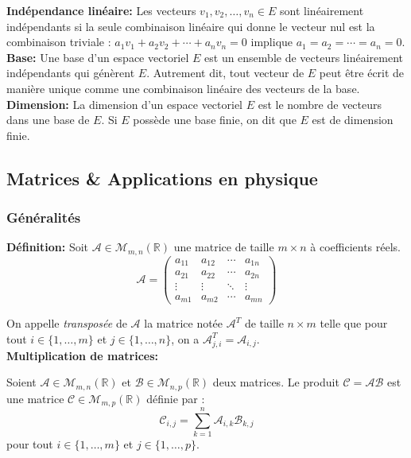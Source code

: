 \textbf{Indépendance linéaire:}
Les vecteurs $v_1, v_2, \ldots, v_n \in E$ sont linéairement indépendants si la seule combinaison linéaire qui donne le vecteur nul est la combinaison triviale : $a_1 v_1 + a_2 v_2 + \cdots + a_n v_n = 0$ implique $a_1 = a_2 = \cdots = a_n = 0$. \\

\textbf{Base:}
Une base d'un espace vectoriel $E$ est un ensemble de vecteurs linéairement indépendants qui génèrent $E$. Autrement dit, tout vecteur de $E$ peut être écrit de manière unique comme une combinaison linéaire des vecteurs de la base. \\

\textbf{Dimension:}
La dimension d'un espace vectoriel $E$ est le nombre de vecteurs dans une base de $E$. Si $E$ possède une base finie, on dit que $E$ est de dimension finie. \\

\subsection{Matrices \& Applications en physique}

\subsubsection{Généralités}
\textbf{Définition:}
Soit $\mathcal{A}  \in \mathcal{M}_{m,n}(\mathbb{R})$ une matrice de taille $m \times n$ à coefficients réels. 
\[
\mathcal{A}  = \begin{pmatrix}
a_{11} & a_{12} & \cdots & a_{1n} \\
a_{21} & a_{22} & \cdots & a_{2n} \\
\vdots & \vdots & \ddots & \vdots \\
a_{m1} & a_{m2} & \cdots & a_{mn}
\end{pmatrix}
\]

On appelle \textit{transposée} de $\mathcal{A}$ la matrice notée $\mathcal{A}^T$ de taille $n \times m$ telle que pour tout $i \in \{1, \ldots, m\}$ et $j \in \{1, \ldots, n\}$, on a $\mathcal{A}^T_{j,i} = \mathcal{A}_{i,j}$. \\


\textbf{Multiplication de matrices:}

Soient $\mathcal{A} \in \mathcal{M}_{m,n}(\mathbb{R})$ et $\mathcal{B} \in \mathcal{M}_{n,p}(\mathbb{R})$ deux matrices. Le produit $\mathcal{C} = \mathcal{A} \mathcal{B}$ est une matrice $\mathcal{C} \in \mathcal{M}_{m,p}(\mathbb{R})$ définie par :
\[
\mathcal{C}_{i,j} = \sum_{k=1}^{n} \mathcal{A}_{i,k} \mathcal{B}_{k,j}
\]
pour tout $i \in \{1, \ldots, m\}$ et $j \in \{1, \ldots, p\}$. \\

